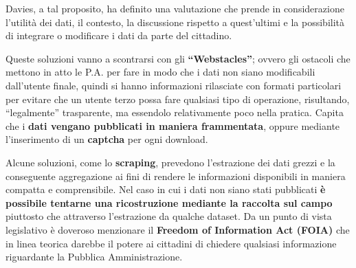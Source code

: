Davies, a tal proposito, ha definito una valutazione che prende in considerazione l'utilità dei dati, il contesto, la discussione rispetto a quest'ultimi e la possibilità di integrare o modificare i dati da parte del cittadino.

\bigbreak
Queste soluzioni vanno a scontrarsi con gli\textbf{ “Webstacles”}; ovvero gli ostacoli che mettono in atto le P.A. per fare in modo che i dati non siano modificabili dall’utente finale, quindi si hanno informazioni rilasciate con formati particolari per evitare che un utente terzo possa fare qualsiasi tipo di operazione, risultando, “legalmente” trasparente, ma essendolo relativamente poco nella pratica.
Capita che i \textbf{dati vengano pubblicati in maniera frammentata}, oppure mediante l'inserimento di un \textbf{captcha} per ogni download.

Alcune soluzioni, come lo \textbf{scraping}, prevedono l'estrazione dei dati grezzi e la conseguente aggregazione ai fini di rendere le informazioni disponibili in maniera compatta e comprensibile.
Nel caso in cui i dati non siano stati pubblicati \textbf{è possibile tentarne una ricostruzione mediante la raccolta sul campo} piuttosto che attraverso l'estrazione da qualche dataset.
\bigbreak
Da un punto di vista legislativo è doveroso menzionare il \textbf{Freedom of Information Act (FOIA)} che in linea teorica darebbe il potere ai cittadini di chiedere qualsiasi informazione riguardante la Pubblica Amministrazione.